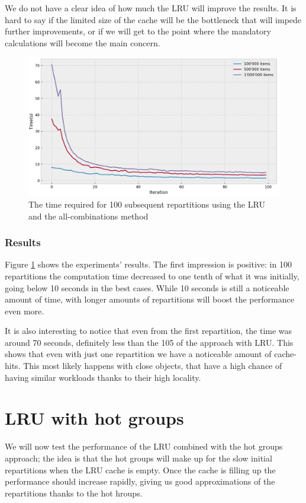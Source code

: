 We do not have a clear idea of how much the LRU will improve the results. It is hard to say if the limited size of the cache will be the bottleneck that will impede further improvements, or if we will get to the point where the mandatory calculations will become the main concern.

\begin{figure}[!htb]
  \centering
  \includegraphics[width=\textwidth,height=\textheight,keepaspectratio]{img/LRU_8.png}
  \caption{The time required for 100 subsequent repartitions using the LRU and the all-combinations method }
  \label{fig:LRU_8}
\end{figure}

\subsubsection{Results}
Figure \ref{fig:LRU_8} shows the experiments' results. The first impression is positive: in 100 repartitions the computation time decreased to one tenth of what it was initially, going below 10 seconds in the best cases. While 10 seconds is still a noticeable amount of time, with longer amounts of repartitions will boost the performance even more. 

It is also interesting to notice that even from the first repartition, the time was around 70 seconds, definitely less than the 105 of the approach with LRU. This shows that even with just one repartition we have a noticeable amount of cache-hits. This most likely happens with close objects, that have a high chance of having similar workloads thanks to their high locality.

\section{LRU with hot groups}\label{sec:lru-hot-groups}
We will now test the performance of the LRU combined with the hot groups approach; the idea is that the hot groups will make up for the slow initial repartitions when the LRU cache is empty. Once the cache is filling up the performance should increase rapidly, giving us good approximations of the repartitions thanks to the hot hroups. 


